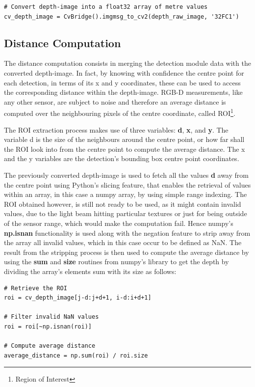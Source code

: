 \begin{lstlisting}
# Convert depth-image into a float32 array of metre values
cv_depth_image = CvBridge().imgmsg_to_cv2(depth_raw_image, '32FC1')
\end{lstlisting}

\subsection{Distance Computation}

The distance computation consists in merging the detection module data with the converted depth-image. In fact, by knowing with confidence the centre point for each detection, in terms of its x and y coordinates, these can be used to access the corresponding distance within the depth-image. RGB-D measurements, like any other sensor, are subject to noise and therefore an average distance is computed over the neighbouring pixels of the centre coordinate, called ROI\footnote{Region of Interest}.

The ROI extraction process makes use of three variables: \textbf{d}, \textbf{x}, and \textbf{y}. The variable d is the size of the neighbours around the centre point, or how far shall the ROI look into from the centre point to compute the average distance. The x and the y variables are the detection's bounding box centre point coordinates.

The previously converted depth-image is used to fetch all the values \textbf{d} away from the centre point using Python's slicing feature, that enables the retrieval of values within an array, in this case a numpy array, by using simple range indexing. The ROI obtained however, is still not ready to be used, as it might contain invalid values, due to the light beam hitting particular textures or just for being outside of the sensor range, which would make the computation fail. Hence numpy's \textbf{np.isnan} functionality is used along with the negation feature to strip away from the array all invalid values, which in this case occur to be defined as NaN. The result from the stripping process is then used to compute the average distance by using the \textbf{sum} and \textbf{size} routines from numpy's library to get the depth by dividing the array's elements sum with its size as follows:

\begin{lstlisting}
# Retrieve the ROI
roi = cv_depth_image[j-d:j+d+1, i-d:i+d+1]
    
# Filter invalid NaN values
roi = roi[~np.isnan(roi)]
    
# Compute average distance
average_distance = np.sum(roi) / roi.size
\end{lstlisting}

